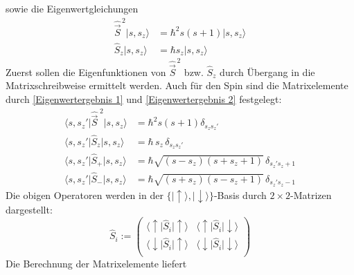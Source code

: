 \documentclass[9pt]{report}
\begin{document}
sowie die Eigenwertgleichungen
\begin{align}
\hat{\vec{S}}^{\,2}|s,s_{z}\rangle &= \hbar^{2}s(s+1)|s,s_{z}\rangle\\
\hat{S}_{z}|s,s_{z}\rangle &= \hbar s_{z}|s,s_{z}\rangle
\end{align}
Zuerst sollen die Eigenfunktionen von $\hat{\vec{S}}^{\,2}$ bzw. $\hat{S}_{z}$ durch Übergang in die Matrixschreibweise ermittelt werden. Auch für den Spin sind die Matrixelemente durch \eqref{Eigenwertergebnis 1} und \eqref{Eigenwertergebnis 2} festgelegt:
\begin{align}
\big\langle s,s_{z}'\big|\hat{\vec{S}}^{\;2}\big|s,s_{z}\big\rangle &= \hbar^{2}s(s+1)\delta_{s_{z}s_{z}'}
\\
\big\langle s,s_{z}'\big|\hat{S}_{z}\big|s,s_{z}\big\rangle &= \hbar \,s_{z}\,\delta_{s_{z}s_{z}'}
\\
\big\langle s,s_{z}'\big|\hat{S}_{+}\big|s,s_{z}\big\rangle &= \hbar\sqrt{(s-s_{z})(s+s_{z}+1)}\,\delta_{s_{z}'s_{z}+1}
\\
\big\langle s,s_{z}'\big|\hat{S}_{-}\big|s,s_{z}\big\rangle &= \hbar\sqrt{(s+s_{z})(s-s_{z}+1)}\,\delta_{s_{z}'s_{z}-1}
\end{align}
Die obigen Operatoren werden in der $\{\big|\uparrow\big\rangle,\big|\downarrow\big\rangle\}$-Basis durch $2\times 2$-Matrizen dargestellt:
\begin{equation}
\renewcommand{\arraystretch}{1.4}
\hat{S}_{i}:=
\left(\begin{array}{cc}
\big\langle \uparrow\big|\hat{S}_i\big|\uparrow\big\rangle
&
\big\langle \uparrow\big|\hat{S}_i\big|\downarrow\big\rangle
\\
\big\langle \downarrow\big|\hat{S}_i\big|\uparrow\big\rangle
& 
\big\langle \downarrow\big|\hat{S}_i\big|\downarrow\big\rangle
\\\end{array}\right)
\end{equation}
Die Berechnung der Matrixelemente liefert
\end{document}
